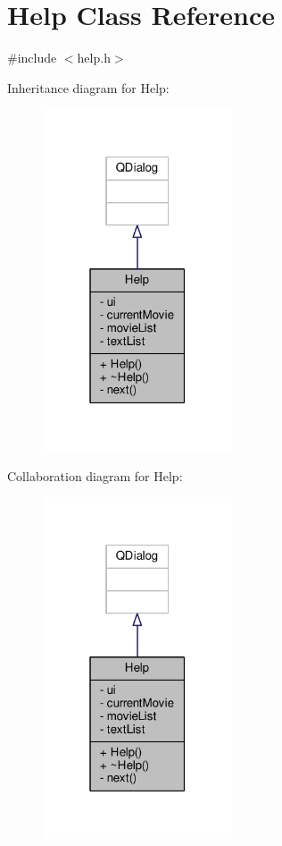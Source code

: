 \hypertarget{classHelp}{}\section{Help Class Reference}
\label{classHelp}


{\ttfamily \#include $<$help.\+h$>$}



Inheritance diagram for Help\+:
\nopagebreak
\begin{figure}[H]
\begin{center}
\leavevmode
\includegraphics[width=159pt]{classHelp__inherit__graph}
\end{center}
\end{figure}


Collaboration diagram for Help\+:
\nopagebreak
\begin{figure}[H]
\begin{center}
\leavevmode
\includegraphics[width=159pt]{classHelp__coll__graph}
\end{center}
\end{figure}
